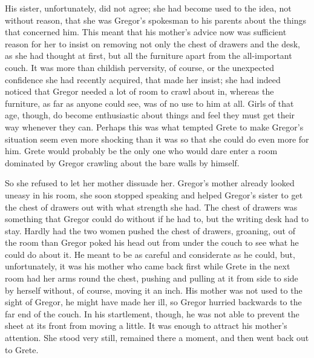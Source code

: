 \documentclass[12pt]{report}
\begin{document}
His sister, unfortunately, did not agree; she had become used to the
idea, not without reason, that she was Gregor's spokesman to his parents
about the things that concerned him. This meant that his mother's advice
now was sufficient reason for her to insist on removing not only the
chest of drawers and the desk, as she had thought at first, but all the
furniture apart from the all-important couch. It was more than childish
perversity, of course, or the unexpected confidence she had recently
acquired, that made her insist; she had indeed noticed that Gregor
needed a lot of room to crawl about in, whereas the furniture, as far as
anyone could see, was of no use to him at all. Girls of that age,
though, do become enthusiastic about things and feel they must get their
way whenever they can. Perhaps this was what tempted Grete to make
Gregor's situation seem even more shocking than it was so that she could
do even more for him. Grete would probably be the only one who would
dare enter a room dominated by Gregor crawling about the bare walls by
himself.

So she refused to let her mother dissuade her. Gregor's mother already
looked uneasy in his room, she soon stopped speaking and helped Gregor's
sister to get the chest of drawers out with what strength she had. The
chest of drawers was something that Gregor could do without if he had
to, but the writing desk had to stay. Hardly had the two women pushed
the chest of drawers, groaning, out of the room than Gregor poked his
head out from under the couch to see what he could do about it. He meant
to be as careful and considerate as he could, but, unfortunately, it was
his mother who came back first while Grete in the next room had her arms
round the chest, pushing and pulling at it from side to side by herself
without, of course, moving it an inch. His mother was not used to the
sight of Gregor, he might have made her ill, so Gregor hurried backwards
to the far end of the couch. In his startlement, though, he was not able
to prevent the sheet at its front from moving a little. It was enough to
attract his mother's attention. She stood very still, remained there a
moment, and then went back out to Grete.
\end{document}
